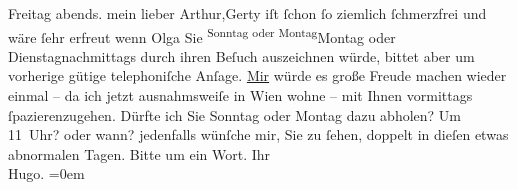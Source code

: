 \begin{ledgroupsized}[t]{13cm}
           \pstart
           Freitag{ }abends.\pend
           \pstart
           mein lieber Arthur,\hspace*{1.5em}Gerty iſt ſchon ſo ziemlich ſchmerzfrei und
               wäre ſehr erfreut wenn Olga Sie \substVorne{}\textsuperscript{Sonntag oder Montag}{\allowbreak}\substDazwischen{}Montag oder Dienstag\substHinten{}{ }{\pb}nachmittags durch ihren Beſuch
               auszeichnen würde, bittet aber um vorherige gütige telephoniſche Anſage.\pend
           \pstart
           \uline{Mir} würde es große Freude machen wieder einmal – da
               ich jetzt ausnahmsweiſe in Wien wohne – mit Ihnen
               vormittags ſpazierenzugehen.\pend
           \pstart
           Dürfte ich Sie Sonntag oder Montag dazu abholen? Um
                  11 Uhr? oder wann? jedenfalls wünſche mir, Sie zu ſehen, doppelt in
               dieſen etwas abnormalen Tagen. Bitte um ein Wort.\pend
           \pstart
           Ihr{\\[\baselineskip]}\spacefill\mbox{Hugo.}\pend
           \leftskip=0em{}
         
         \endnumbering{}\end{ledgroupsized}  \newcommand{\dateiname}{L01923}\newcommand{\titel}{Hugo von Hofmannsthal an Arthur Schnitzler, 8. 4. 1910}\newcommand{\editorInnen}{Martin Anton Müller und Gerd-Hermann Susen}
      